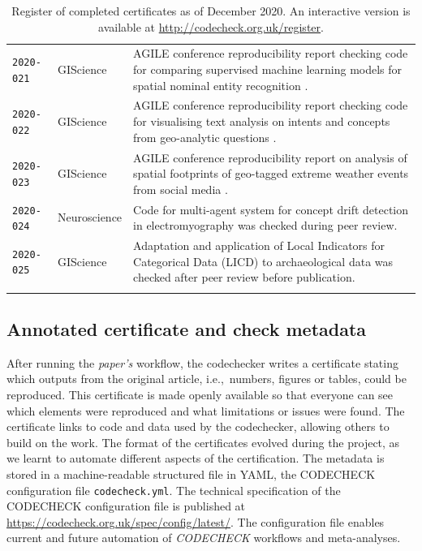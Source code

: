\documentclass[12pt]{article}
\newcommand{\rev}[1]{\textit{#1}}
\begin{document}
\begin{table}
\begin{tabular}{llp{12cm}}
    \texttt{2020-021}  \cite{cert-2020-021} & GIScience & AGILE conference reproducibility report checking code for comparing supervised machine learning models for spatial nominal entity recognition \cite{Medad2020}. \\ %
    \texttt{2020-022}  \cite{cert-2020-022} & GIScience & AGILE conference reproducibility report checking code for visualising text analysis on intents and concepts from geo-analytic questions \cite{Xu2020}. \\ %
    \texttt{2020-023}  \cite{cert-2020-023} & GIScience & AGILE conference reproducibility report on analysis of spatial footprints of geo-tagged extreme weather events from social media \cite{Owuor2020}. \\
    \texttt{2020-024}  \cite{cert-2020-024} & Neuroscience & Code for multi-agent system for concept drift detection in electromyography \cite{vieira_driftage_2020} was checked during peer review. \\ %
    \texttt{2020-025}  \cite{cert-2020-025} & GIScience & Adaptation and application of Local Indicators for Categorical Data (LICD) to archaeological data \cite{carrer_application_2021} was checked after peer review before publication. \\ %
    \\ \bottomrule
  \end{tabular}
  \caption{Register of completed certificates as of December 2020. An interactive version
  is available at \url{http://codecheck.org.uk/register}.
  }
  \label{tab:register}
\end{table}

\subsection*{Annotated certificate and check metadata}\label{annotated-certificate}

After running the \rev{paper's} workflow, the codechecker writes a certificate
stating which outputs from the original article, i.e.,~numbers,
figures or tables, could be reproduced.  This certificate is made
openly available so that everyone can see which
elements were reproduced and what limitations or issues were found.
The certificate links to code and data used by the codechecker,
allowing others to build on the work.  The format of the certificates
evolved during the project, as we learnt to automate different
aspects of the certification.  The metadata
is stored in a machine-readable structured file in YAML, the CODECHECK
configuration file \texttt{codecheck.yml}.
The technical specification of the CODECHECK configuration file is
published at \url{https://codecheck.org.uk/spec/config/latest/}.  The
configuration file enables current and future automation of \rev{CODECHECK} workflows
and meta-analyses.
\end{document}
